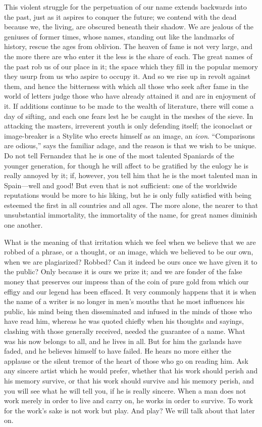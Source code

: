 This violent struggle for the perpetuation of our name extends
backwards into the past, just as it aspires to  conquer the
future; we contend with the dead because we, the living, are obscured
beneath their shadow. We are jealous of the geniuses of former times,
whose names, standing out like the landmarks of history, rescue the
ages from oblivion. The heaven of fame is not very large, and the more
there are who enter it the less is the share of each. The great names
of the past rob us of our place in it; the space which they fill in
the popular memory they usurp from us who aspire to occupy it. And so
we rise up in revolt against them, and hence the bitterness with which
all those who seek after fame in the world of letters judge those who
have already attained it and are in enjoyment of it. If additions
continue to be made to the wealth of literature, there will come a day
of sifting, and each one fears lest he be caught in the meshes of the
sieve. In attacking the masters, irreverent youth is only defending
itself; the iconoclast or image-breaker is a Stylite who erects
himself as an image, an \textit{icon}. ``Comparisons are odious,''
says the familiar adage, and the reason is that we wish to be unique.
Do not tell Fernandez that he is one of the most talented Spaniards of
the younger generation, for though he will affect to be gratified by
the eulogy he is really annoyed by it; if, however, you tell him that
he is the most talented man in Spain---well and good! But even that is
not sufficient: one of the worldwide reputations would be more to his
liking, but he is only fully satisfied with being esteemed the first
in all countries and all ages. The more alone, the nearer to that
unsubstantial immortality, the immortality of the name, for great
names diminish one another.

What is the meaning of that irritation which we feel when we believe
that we are robbed of a phrase, or a thought, or an image, which we
believed to be our own, when we are plagiarized? Robbed? Can it indeed
be ours once we have given it to the public? Only because it is ours
we prize it; and we are fonder of the false money  that
preserves our impress than of the coin of pure gold from which our
effigy and our legend has been effaced. It very commonly happens that
it is when the name of a writer is no longer in men's mouths that he
most influences his public, his mind being then disseminated and
infused in the minds of those who have read him, whereas he was quoted
chiefly when his thoughts and sayings, clashing with those generally
received, needed the guarantee of a name. What was his now belongs to
all, and he lives in all. But for him the garlands have faded, and he
believes himself to have failed. He hears no more either the applause
or the silent tremor of the heart of those who go on reading him. Ask
any sincere artist which he would prefer, whether that his work should
perish and his memory survive, or that his work should survive and his
memory perish, and you will see what he will tell you, if he is really
sincere. When a man does not work merely in order to live and carry
on, he works in order to survive. To work for the work's sake is not
work but play. And play? We will talk about that later on.

